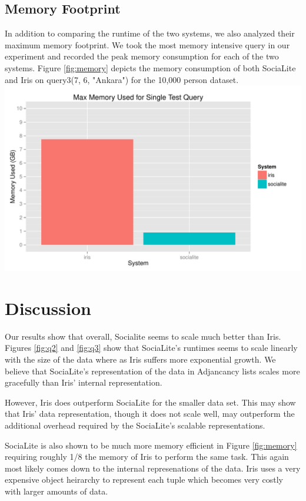 \documentclass{article}
\begin{document}
\begin{multicols}{2}
\subsection {Memory Footprint} 
In addition to comparing the runtime of the two systems, we also analyzed their maximum memory footprint. We took the most memory intensive query in our experiment and recorded the peak memory consumption for each of the two systems. Figure \ref{fig:memory} depicts the memory consumption of both SociaLite and Iris on query3(7, 6, "Ankara") for the 10,000 person dataset. 
\begingroup
    \centering
    \includegraphics[scale=0.4]{../results/memory.pdf}
    \label{fig:memory}
\endgroup


\section{Discussion}
Our results show that overall, Socialite seems to scale much better than Iris. Figures \ref{fig:q2} and \ref{fig:q3} show that SociaLite's runtimes seems to scale linearly with the size of the data where as Iris suffers more exponential growth. We believe that SociaLite's representation of the data in Adjancancy lists scales more gracefully than Iris' internal representation.

However, Iris does outperform SociaLite for the smaller data set. This may show that Iris' data representation, though it does not scale well, may outperform the additional overhead required by the SociaLite's scalable representations.

SociaLite is also shown to be much more memory efficient in Figure \ref{fig:memory} requiring roughly 1/8 the memory of Iris to perform the same task. This again most likely comes down to the internal represenations of the data. Iris uses a very expensive object heirarchy to represent each tuple which becomes very costly with larger amounts of data.





\end{multicols}
\end{document}
